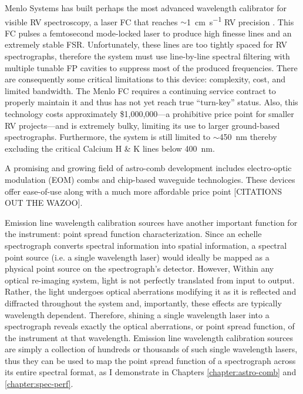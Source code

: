 Menlo Systems has built perhaps the most advanced wavelength calibrator for visible RV spectroscopy, a laser FC that reaches $\sim$\SI{1}{\centi\meter\per\second} RV precision \citep{probst_laser_2014}. This FC pulses a femtosecond mode-locked laser to produce high finesse lines and an extremely stable FSR. Unfortunately, these lines are too tightly spaced for RV spectrographs, therefore the system must use line-by-line spectral filtering with multiple tunable FP cavities to suppress most of the produced frequencies. There are consequently some critical limitations to this device: complexity, cost, and limited bandwidth. The Menlo FC requires a continuing service contract to properly maintain it and thus has not yet reach true ``turn-key'' status. Also, this technology costs approximately \$1,000,000---a prohibitive price point for smaller RV projects---and is extremely bulky, limiting its use to larger ground-based spectrographs. Furthermore, the system is still limited to $\sim$\SI{450}{\nano\meter} thereby excluding the critical Calcium H \& K lines below \SI{400}{\nano\meter}.

A promising and growing field of astro-comb development includes electro-optic modulation (EOM) combs and chip-based waveguide technologies. These devices offer ease-of-use along with a much more affordable price point [CITATIONS OUT THE WAZOO].

Emission line wavelength calibration sources have another important function for the instrument: point spread function characterization. Since an echelle spectrograph converts spectral information into spatial information, a spectral point source (i.e. a single wavelength laser) would ideally be mapped as a physical point source on the spectrograph's detector. However, Within any optical re-imaging system, light is not perfectly translated from input to output. Rather, the light undergoes optical aberrations modifying it as it is reflected and diffracted throughout the system and, importantly, these effects are typically wavelength dependent. Therefore, shining a single wavelength laser into a spectrograph reveals exactly the optical aberrations, or point spread function, of the instrument at that wavelength. Emission line wavelength calibration sources are simply a collection of hundreds or thousands of such single wavelength lasers, thus they can be used to map the point spread function of a spectrograph across its entire spectral format, as I demonstrate in Chapters \ref{chapter:astro-comb} and \ref{chapter:spec-perf}.

